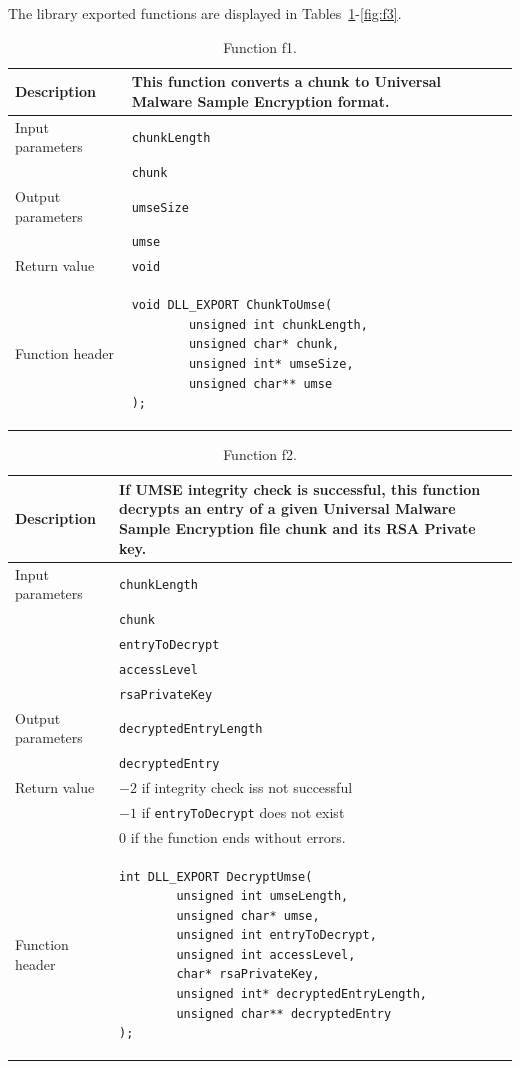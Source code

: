 The library exported functions are displayed in
Tables~\ref{fig:f1}-\ref{fig:f3}.
\begin{table}
  \centering
  \begin{tabular}{|l|p{}|} \hline
    Description	& This function converts a chunk to Universal Malware Sample
                  Encryption format. \\ \hline
    Input parameters &	\texttt{chunkLength} \\
                     & \texttt{chunk} \\ \hline
    Output parameters & \texttt{umseSize} \\
                      & \texttt{umse} \\ \hline
    Return value & \texttt{void} \\ \hline
    Function header	&
\begin{verbatim}
void DLL_EXPORT ChunkToUmse(
        unsigned int chunkLength,
        unsigned char* chunk,
        unsigned int* umseSize,
        unsigned char** umse
);
\end{verbatim}
    \\ \hline
  \end{tabular}
  \caption{\label{fig:f1} Function f1.}
\end{table}
\begin{table}
  \centering
  \begin{tabular}{|l|p{}|} \hline
    Description	& If UMSE integrity check is successful, this function
                  decrypts an entry of a given Universal Malware Sample
                  Encryption file chunk and its RSA Private key.  \\ \hline
    Input parameters &	\texttt{chunkLength} \\
                & \texttt{chunk} \\
                & \texttt{entryToDecrypt} \\
                & \texttt{accessLevel} \\
                & \texttt{rsaPrivateKey} \\ \hline
    Output parameters & \texttt{decryptedEntryLength} \\
                      & \texttt{decryptedEntry} \\ \hline
    Return value & $-2$ if integrity check iss not successful \\
                & $-1$ if \texttt{entryToDecrypt} does not exist \\
    & $0$ if the function ends without errors. \\ \hline
    Function header	&
\begin{verbatim}
int DLL_EXPORT DecryptUmse(
        unsigned int umseLength,
        unsigned char* umse,
        unsigned int entryToDecrypt,
        unsigned int accessLevel,
        char* rsaPrivateKey,
        unsigned int* decryptedEntryLength,
        unsigned char** decryptedEntry
);
\end{verbatim}
    \\ \hline
  \end{tabular}
  \caption{\label{fig:f2} Function f2.}
\end{table}
